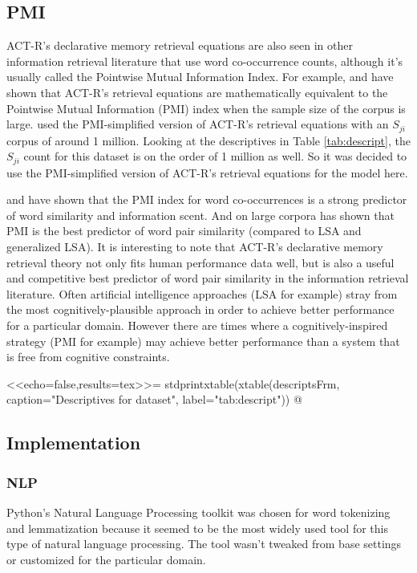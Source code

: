 \documentclass[10pt,letterpaper]{article}
\begin{document}
\subsection{PMI}

ACT-R's declarative memory retrieval equations are also seen in other information retrieval literature that use word co-occurrence counts, although it's usually called the Pointwise Mutual Information Index.
For example, \cite{Fu2007} and \cite{Farahat2004} have shown that ACT-R's retrieval equations are mathematically equivalent to the Pointwise Mutual Information (PMI) index when the sample size of the corpus is large.
\cite{Douglass2007} used the PMI-simplified version of ACT-R's retrieval equations with an $S_{ji}$ corpus of around 1 million.
Looking at the descriptives in Table \ref{tab:descript}, the $S_{ji}$ count for this dataset is on the order of 1 million as well.
So it was decided to use the PMI-simplified version of ACT-R's retrieval equations for the model here.

\cite{Budiu2007} and \cite{Farahat2004} have shown that the PMI index for word co-occurrences is a strong predictor of word similarity and information scent.
And on large corpora \cite{Budiu2007} has shown that PMI is the best predictor of word pair similarity (compared to LSA and generalized LSA).
It is interesting to note that ACT-R's declarative memory retrieval theory not only fits human performance data well, but is also a useful and competitive best predictor of word pair similarity in the information retrieval literature.
Often artificial intelligence approaches (LSA for example) stray from the most cognitively-plausible approach in order to achieve better performance for a particular domain.
However there are times where a cognitively-inspired strategy (PMI for example) may achieve better performance than a system that is free from cognitive constraints.

<<echo=false,results=tex>>=
stdprintxtable(xtable(descriptsFrm, caption="Descriptives for dataset", label="tab:descript"))
@

\subsection{Implementation}

\subsubsection{NLP}

Python's Natural Language Processing toolkit was chosen for word tokenizing and lemmatization because it seemed to be the most widely used tool for this type of natural language processing.
The tool wasn't tweaked from base settings or customized for the particular domain.
\end{document}
